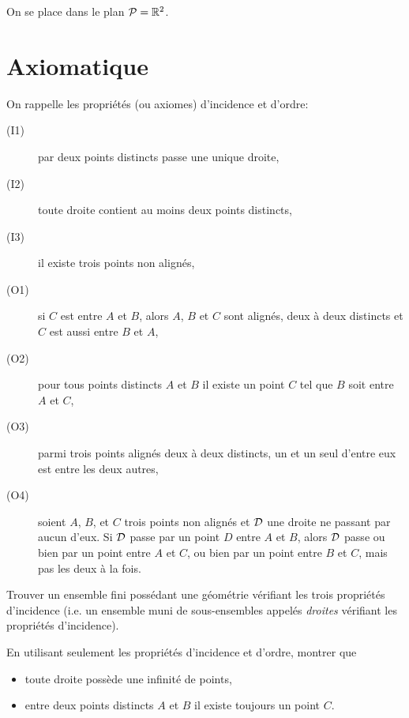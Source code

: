 \documentclass[a4paper,11pt,reqno]{amsart}
\begin{document}

On se place dans le plan $\mathcal{P}=\mathbb{R}^2$.

\section{Axiomatique}

On rappelle les propriétés (ou axiomes) d'incidence et d'ordre:
\begin{description}
 \item[(I1)] par deux points distincts passe une unique droite,
 \item[(I2)] toute droite contient au moins deux points distincts,
 \item[(I3)] il existe trois points non alignés,
 \item [(O1)] si $C$ est entre $A$ et $B$, alors $A$, $B$ et $C$ sont alignés, deux à deux distincts et $C$ est aussi entre $B$ et $A$,
 \item[(O2)] pour tous points distincts $A$ et $B$ il existe un point $C$ tel que $B$ soit entre $A$ et $C$,
 \item[(O3)] parmi trois points alignés deux à deux distincts, un et un seul d'entre eux est entre les deux autres,
 \item[(O4)] soient $A$, $B$, et $C$ trois points non alignés et $\mathcal{D}$ une droite ne passant par aucun d'eux. Si $\mathcal{D}$ passe par un point $D$ entre $A$ et $B$, alors $\mathcal{D}$ passe ou bien par un point entre $A$ et $C$, ou bien par un point entre $B$ et $C$, mais pas les deux à la fois.
\end{description}



\begin{exo}
Trouver un ensemble fini possédant une géométrie vérifiant les trois propriétés d'incidence (i.e. un ensemble muni de sous-ensembles appelés \emph{droites} vérifiant les propriétés d'incidence).
\end{exo}

\begin{exo}
 En utilisant seulement les propriétés d'incidence et d'ordre, montrer que
 \begin{itemize}
  \item toute droite possède une infinité de points,
  \item entre deux points distincts $A$ et $B$ il existe toujours un point $C$.
 \end{itemize}
\end{exo}
\end{document}
